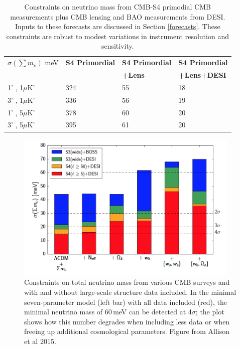 \begin{table}[htbp]
\centering
\caption{Constraints on neutrino mass from CMB-S4 primodial CMB measurements plus CMB lensing and BAO measurements from DESI.  Inputs to these forecasts are discussed in Section \ref{forecasts}.  These constraints are robust to modest variations in instrument resolution and sensitivity.\vspace{0.2cm}}
\label{neutrinoTable}
\begin{tabular}{|l|l|l|l|}
\hline
$\sigma(\sum m_{\nu})$ meV & \textbf{S4 Primordial} & \textbf{S4 Primordial} & \textbf{S4 Primordial} \\
&                         &  \textbf{+Lens} & \textbf{+Lens+DESI} \\ \hline
1' , 1$\mu$K'              & 324         & 55               & 18                    \\ \hline
3' , 1$\mu$K'              & 336         & 56               & 19                    \\ \hline
1' , 5$\mu$K'              & 378         & 60               & 20                    \\ \hline
3' , 5$\mu$K'              & 395         & 61               & 20                    \\ \hline
\end{tabular}
\end{table}


\begin{figure}[htbp]
\centering
\includegraphics[width=0.95\textwidth]{CMBLensing/Allisonetal.png}
\caption{Constraints on total neutrino mass from various CMB surveys  and with and without large-scale structure data included.   In the minimal seven-parameter model (left bar) with all data included (red), the minimal neutrino mass of 60\,meV can be detected at 4$\sigma$; the plot shows how this number degrades when including less data or when freeing up additional cosmological parameters. Figure from Allison et al 2015.} 
\label{nuForecasts}
\end{figure}



